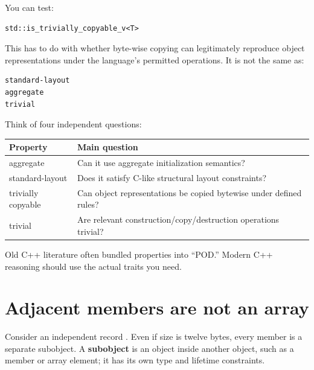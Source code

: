 You can test:

\begin{verbatim}
std::is_trivially_copyable_v<T>
\end{verbatim}

This has to do with whether byte-wise copying can legitimately reproduce object representations under the language's permitted operations. It is not the same as:

\begin{verbatim}
standard-layout
aggregate
trivial
\end{verbatim}

Think of four independent questions:

{\def\LTcaptype{none} %
\begin{longtable}[]{@{}
  >{\raggedright\arraybackslash}p{}
  >{\raggedright\arraybackslash}p{}@{}}
\toprule\noalign{}
\begin{minipage}[b]{\linewidth}\raggedright
Property
\end{minipage} & \begin{minipage}[b]{\linewidth}\raggedright
Main question
\end{minipage} \\
\midrule\noalign{}
\endhead
\bottomrule\noalign{}
\endlastfoot
aggregate & Can it use aggregate initialization semantics? \\
standard-layout & Does it satisfy C-like structural layout constraints? \\
trivially copyable & Can object representations be copied bytewise under defined rules? \\
trivial & Are relevant construction/copy/destruction operations trivial? \\
\end{longtable}
}

Old C++ literature often bundled properties into ``POD.'' Modern C++ reasoning should use the actual traits you need.

\section{Adjacent members are not an array}\label{05-engine-i-ch003-adjacent-members-are-not-an-array}

\hypertarget{05-engine-i-ch003-adjacent-members-are-not-an-array}{}

Consider an independent record . Even if size is twelve bytes, every member is a separate subobject. A \textbf{subobject} is an object inside another object, such as a member or array element; it has its own type and lifetime constraints.

